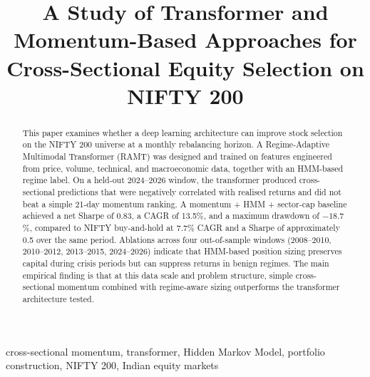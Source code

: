\documentclass[conference]{IEEEtran}
\begin{document}
\title{A Study of Transformer and Momentum-Based Approaches for Cross-Sectional Equity Selection on NIFTY 200}

\author{
\and
{}
}

\maketitle

\begin{abstract}
This paper examines whether a deep learning architecture can improve stock selection on the NIFTY 200 universe at a monthly rebalancing horizon. A Regime-Adaptive Multimodal Transformer (RAMT) was designed and trained on features engineered from price, volume, technical, and macroeconomic data, together with an HMM-based regime label. On a held-out 2024--2026 window, the transformer produced cross-sectional predictions that were negatively correlated with realised returns and did not beat a simple 21-day momentum ranking. A momentum + HMM + sector-cap baseline achieved a net Sharpe of 0.83, a CAGR of 13.5\%, and a maximum drawdown of $-18.7$\%, compared to NIFTY buy-and-hold at 7.7\% CAGR and a Sharpe of approximately 0.5 over the same period. Ablations across four out-of-sample windows (2008--2010, 2010--2012, 2013--2015, 2024--2026) indicate that HMM-based position sizing preserves capital during crisis periods but can suppress returns in benign regimes. The main empirical finding is that at this data scale and problem structure, simple cross-sectional momentum combined with regime-aware sizing outperforms the transformer architecture tested.
\end{abstract}

\begin{IEEEkeywords}
cross-sectional momentum, transformer, Hidden Markov Model, portfolio construction, NIFTY 200, Indian equity markets
\end{IEEEkeywords}
\end{document}
